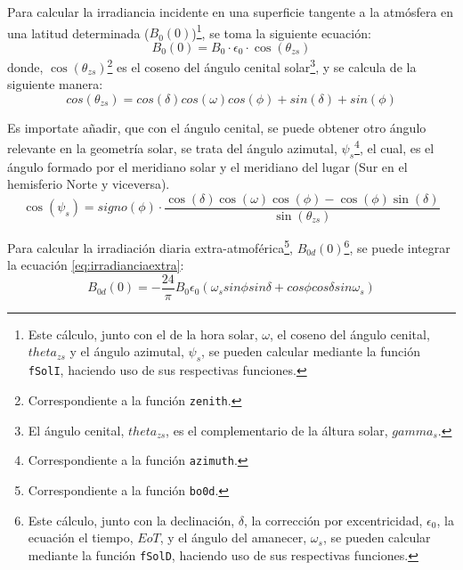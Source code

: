 Para calcular la irradiancia incidente en una superficie tangente a la atmósfera en una latitud determinada (\(B_0(0)\))\footnote{Este cálculo, junto con el de la hora solar, \(\omega\), el coseno del ángulo cenital, \(theta_{zs}\) y  el ángulo azimutal, \(\psi_s\), se pueden calcular mediante la función \texttt{fSolI}, haciendo uso de sus respectivas funciones.}, se toma la siguiente ecuación: 
\begin{equation}
B_0(0)=B_0 \cdot \epsilon_0 \cdot \cos(\theta_{zs})
\label{eq:irradianciaextra}
\end{equation}
donde, \(\cos(\theta_{zs})\)\footnote{Correspondiente a la función \texttt{zenith}.} es el coseno del ángulo cenital solar\footnote{El ángulo cenital, \(theta_{zs}\), es el complementario de la áltura solar, \(gamma_s\).}, y se calcula de la siguiente manera:
\begin{equation}
cos(\theta_{zs})=cos(\delta)cos(\omega)cos(\phi)+sin(\delta)+sin(\phi)
\end{equation}

Es importate añadir, que con el ángulo cenital, se puede obtener otro ángulo relevante en la geometría solar, se trata del ángulo azimutal, \(\psi_s\)\footnote{Correspondiente a la función \texttt{azimuth}.}, el cual, es el ángulo formado por el meridiano solar y el meridiano del lugar (Sur en el hemisferio Norte y viceversa). 
\begin{equation}
\cos(\psi_s)=signo(\phi)\cdot \frac{\cos(\delta)\cos(\omega)\cos(\phi)-\cos(\phi)\sin(\delta)}{\sin(\theta_{zs})}
\end{equation}

Para calcular la irradiación diaria extra-atmoférica\footnote{Correspondiente a la función \texttt{bo0d}.}, \(B_{0d}(0)\)\footnote{Este cálculo, junto con la declinación, \(\delta\), la corrección por excentricidad, \(\epsilon_0\), la ecuación el tiempo, \(EoT\), y el ángulo del amanecer, \(\omega_s\), se pueden calcular mediante la función \texttt{fSolD}, haciendo uso de sus respectivas funciones.}, se puede integrar la ecuación \ref{eq:irradianciaextra}:
\begin{equation}
B_{0d}(0)=-\frac{24}{\pi}B_0\epsilon_0(\omega_s sin\phi sin\delta + cos\phi cos\delta sin \omega_s)
\label{eq:irradiacionextra}
\end{equation}

